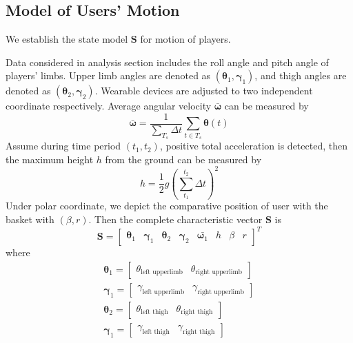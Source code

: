 \documentclass[12pt]{article}
\begin{document}
    \subsection{Model of Users' Motion}
    We establish the state model $\bm{S}$ for motion of players. \par
    \begin{minipage}[b]{0.55\linewidth}
        Data considered in analysis section includes the roll angle and pitch angle of players' limbs. Upper limb angles are denoted as $(\bm{\theta}_1, \bm{\gamma}_1)$, and thigh angles are denoted as $(\bm{\theta}_2, \bm{\gamma}_2)$. Wearable devices are adjusted to two independent coordinate respectively. Average angular velocity $\bar{\bm{\omega}}$ can be measured by
        \begin{equation}
            \bar{\bm{\omega}} = \frac{1}{\sum_{T_s} \Delta t}\sum_{t \in T_s} \bm{\theta}(t)
        \end{equation}
        Assume during time period $(t_1, t_2)$, positive total acceleration is detected, then the maximum height $h$ from the ground can be measured by
        \begin{equation}
            h = \frac{1}{2} g \left( \sum_{t_1}^{t_2} \Delta t\right)^2
        \end{equation}
        Under polar coordinate, we depict the comparative position of user with the basket with $(\beta, r)$.
        Then the complete characteristic vector $\bm{S}$ is
        \begin{equation}
            \bm{S} = \begin{bmatrix}
                \bm{\theta}_1 & \bm{\gamma}_1 & \bm{\theta}_2 & \bm{\gamma}_2 & \bar{\bm{\omega}_1} & h & \beta & r
            \end{bmatrix}^T
        \end{equation}
        where
        \begin{gather}
            \bm{\theta}_1 = \begin{bmatrix}
                \theta_{\text{left upperlimb}} & \theta_{\text{right upperlimb}}
            \end{bmatrix} \\ \bm{\gamma}_1 = 
            \begin{bmatrix}
                \gamma_{\text{left upperlimb}} & \gamma_{\text{right upperlimb}}
            \end{bmatrix} \\
            \bm{\theta}_2 = \begin{bmatrix}
                \theta_{\text{left thigh}} & \theta_{\text{right thigh}}
            \end{bmatrix} \\ \bm{\gamma}_1 = 
            \begin{bmatrix}
                \gamma_{\text{left thigh}} & \gamma_{\text{right thigh}}
            \end{bmatrix}
        \end{gather}
        \end{minipage}
\end{document}
